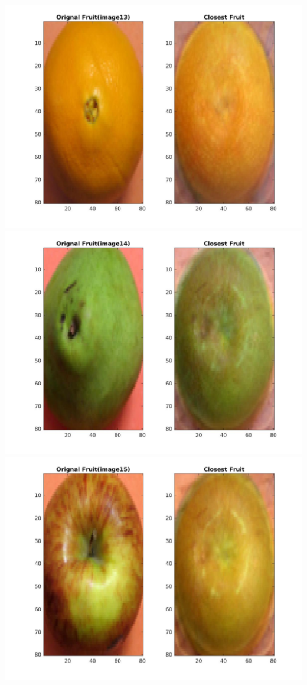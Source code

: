 \documentclass[12pt, a4paper]{article}
\begin{document}
\includegraphics[width=\textwidth, height = 0.25\paperheight]{Closest_fruit_analysis_13}
\includegraphics[width=\textwidth, height = 0.25\paperheight]{Closest_fruit_analysis_14}
\includegraphics[width=\textwidth, height = 0.25\paperheight]{Closest_fruit_analysis_15}
\end{document}

